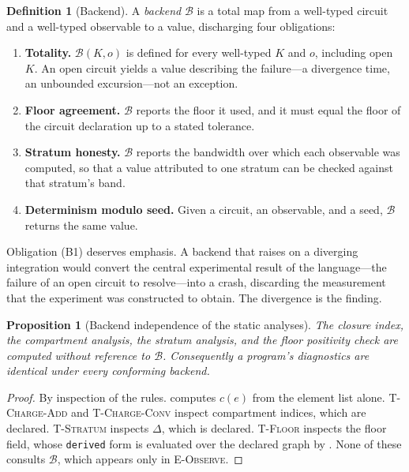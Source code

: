 \documentclass[11pt,twocolumn,a4paper]{article}
\theoremstyle{thmstyle}
\newtheorem{proposition}[theorem]{Proposition}
\theoremstyle{definition}
\newtheorem{definition}[theorem]{Definition}
\theoremstyle{remark}
\begin{document}
\begin{definition}[Backend]
\label{def:backend}
A \emph{backend} $\mathcal{B}$ is a total map from a well-typed circuit and a
well-typed observable to a value, discharging four obligations:
\begin{enumerate}[label=\textup{(B\arabic*)},leftmargin=3.4em,nosep]
\item \textbf{Totality.} $\mathcal{B}(K,o)$ is defined for every well-typed
$K$ and $o$, including open $K$. An open circuit yields a value describing the
failure---a divergence time, an unbounded excursion---not an exception.
\item \textbf{Floor agreement.} $\mathcal{B}$ reports the floor it used, and
it must equal the floor of the circuit declaration up to a stated tolerance.
\item \textbf{Stratum honesty.} $\mathcal{B}$ reports the bandwidth over which
each observable was computed, so that a value attributed to one stratum can be
checked against that stratum's band.
\item \textbf{Determinism modulo seed.} Given a circuit, an observable, and a
seed, $\mathcal{B}$ returns the same value.
\end{enumerate}
\end{definition}

Obligation (B1) deserves emphasis. A backend that raises on a diverging
integration would convert the central experimental result of the language---the
failure of an open circuit to resolve---into a crash, discarding the
measurement that the experiment was constructed to obtain. The divergence is
the finding.

\begin{proposition}[Backend independence of the static analyses]
\label{prop:backend-independent}
The closure index, the compartment analysis, the stratum analysis, and the
floor positivity check are computed without reference to $\mathcal{B}$.
Consequently a program's diagnostics are identical under every conforming
backend.
\end{proposition}

\begin{proof}
By inspection of the rules.  computes $c(e)$ from
the element list alone. \textsc{T-Charge-Add} and \textsc{T-Charge-Conv}
inspect compartment indices, which are declared. \textsc{T-Stratum} inspects
$\Delta$, which is declared. \textsc{T-Floor} inspects the floor field, whose
\texttt{derived} form is evaluated over the declared graph by
. None of these consults $\mathcal{B}$, which appears only in
\textsc{E-Observe}.
\end{proof}
\end{document}
